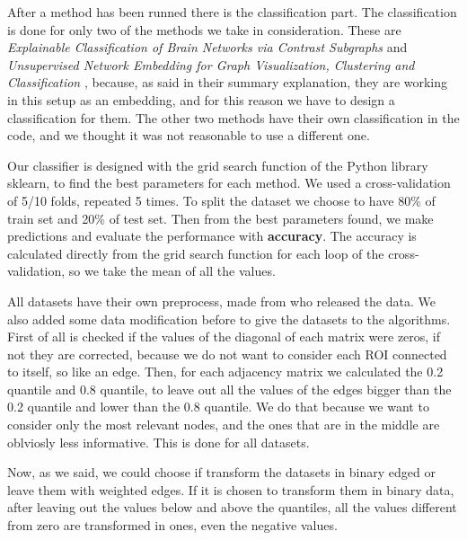 After a method has been runned there is the classification part. The classification is done for only two of the methods we take in consideration. These are \textit{Explainable Classification of Brain Networks via Contrast Subgraphs} \cite{lanciano2020cs} and \textit{Unsupervised Network Embedding for Graph Visualization, Clustering and Classification} \cite{GutierrezUn}, because, as said in their summary explanation, they are working in this setup as an embedding, and for this reason we have to design a classification for them. The other two methods have their own classification in the code, and we thought it was not reasonable to use a different one.
\vspace{0.5cm}


Our classifier is designed with the grid search function of the Python library sklearn, to find the best parameters for each method. We used a cross-validation of 5/10 folds, repeated 5 times. To split the dataset we choose to have 80\% of train set and 20\% of test set. Then from the best parameters found, we make predictions and evaluate the performance with \textbf{accuracy}. The accuracy is calculated directly from the grid search function for each loop of the cross-validation, so we take the mean of all the values. 
\vspace{0.5cm}

All datasets have their own preprocess, made from who released the data. We also added some data modification before to give the datasets to the algorithms. First of all is checked if the values of the diagonal of each matrix were zeros, if not they are corrected, because we do not want to consider each ROI connected to itself, so like an edge. Then, for each adjacency matrix we calculated the 0.2 quantile and 0.8 quantile, to leave out all the values of the edges bigger than the 0.2 quantile and lower than the 0.8 quantile. We do that because we want to consider only the most relevant nodes, and the ones that are in the middle are oblviosly less informative. This is done for all datasets. 
\vspace{0.5cm}

Now, as we said, we could choose if transform the datasets in binary edged or leave them with weighted edges. If it is chosen to transform them in binary data, after leaving out the values below and above the quantiles, all the values different from zero are transformed in ones, even the negative values.

